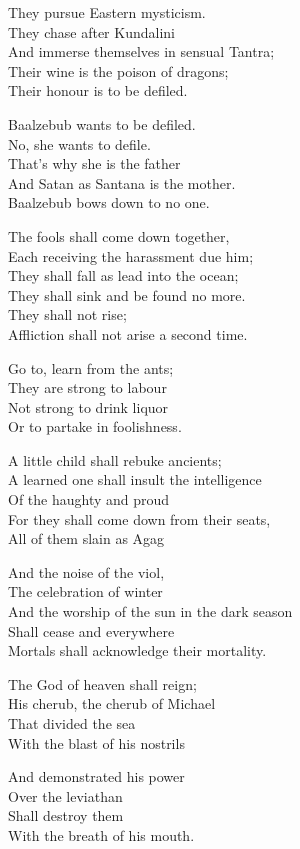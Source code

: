 \documentclass[
]{book}
\begin{document}
They pursue Eastern mysticism.\\
They chase after Kundalini\\
And immerse themselves in sensual Tantra;\\
Their wine is the poison of dragons;\\
Their honour is to be defiled.

Baalzebub wants to be defiled.\\
No, she wants to defile.\\
That's why she is the father\\
And Satan as Santana is the mother.\\
Baalzebub bows down to no one.

The fools shall come down together,\\
Each receiving the harassment due him;\\
They shall fall as lead into the ocean;\\
They shall sink and be found no more.\\
They shall not rise;\\
Affliction shall not arise a second time.

Go to, learn from the ants;\\
They are strong to labour\\
Not strong to drink liquor\\
Or to partake in foolishness.

A little child shall rebuke ancients;\\
A learned one shall insult the intelligence\\
Of the haughty and proud\\
For they shall come down from their seats,\\
All of them slain as Agag

And the noise of the viol,\\
The celebration of winter\\
And the worship of the sun in the dark season\\
Shall cease and everywhere\\
Mortals shall acknowledge their mortality.

The God of heaven shall reign;\\
His cherub, the cherub of Michael\\
That divided the sea\\
With the blast of his nostrils

And demonstrated his power\\
Over the leviathan\\
Shall destroy them\\
With the breath of his mouth.
\end{document}
